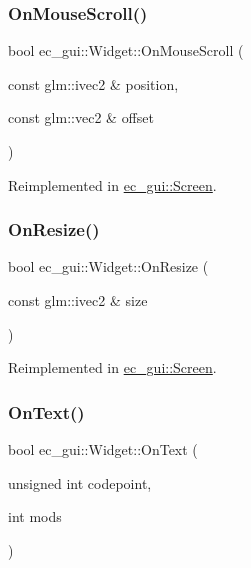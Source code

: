 \subsubsection{\texorpdfstring{On\+Mouse\+Scroll()}{OnMouseScroll()}}
{\footnotesize\ttfamily bool ec\+\_\+gui\+::\+Widget\+::\+On\+Mouse\+Scroll (\begin{DoxyParamCaption}\item[{const glm\+::ivec2 \&}]{position,  }\item[{const glm\+::vec2 \&}]{offset }\end{DoxyParamCaption})\hspace{0.3cm}{\ttfamily [virtual]}}



Reimplemented in \mbox{\hyperlink{classec__gui_1_1_screen_aff591b1b897b9237a3ab734689282c0e}{ec\+\_\+gui\+::\+Screen}}.

\mbox{\label{classec__gui_1_1_widget_af352c24c35835706de550ee3b9cfbf91}} 
\subsubsection{\texorpdfstring{On\+Resize()}{OnResize()}}
{\footnotesize\ttfamily bool ec\+\_\+gui\+::\+Widget\+::\+On\+Resize (\begin{DoxyParamCaption}\item[{const glm\+::ivec2 \&}]{size }\end{DoxyParamCaption})\hspace{0.3cm}{\ttfamily [virtual]}}



Reimplemented in \mbox{\hyperlink{classec__gui_1_1_screen_a739fe1176382a7f6f399610da74972ea}{ec\+\_\+gui\+::\+Screen}}.

\mbox{\label{classec__gui_1_1_widget_a99980fcd7af47e9f9d29c85a404729f6}} 
\subsubsection{\texorpdfstring{On\+Text()}{OnText()}}
{\footnotesize\ttfamily bool ec\+\_\+gui\+::\+Widget\+::\+On\+Text (\begin{DoxyParamCaption}\item[{unsigned int}]{codepoint,  }\item[{int}]{mods }\end{DoxyParamCaption})\hspace{0.3cm}{\ttfamily [virtual]}}



